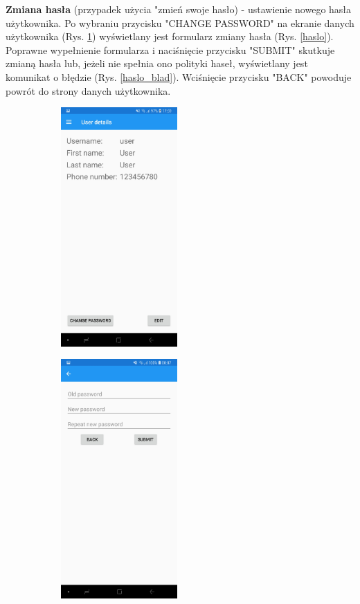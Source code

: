\textbf{Zmiana hasła} (przypadek użycia "zmień swoje hasło) - ustawienie nowego hasła użytkownika. Po wybraniu przycisku "CHANGE PASSWORD" na ekranie danych użytkownika (Rys. \ref{uzytkownik_pass}) wyświetlany jest formularz zmiany hasła (Rys. \ref{haslo}). Poprawne wypełnienie formularza i naciśnięcie przycisku "SUBMIT" skutkuje zmianą hasła lub, jeżeli nie spełnia ono polityki haseł, wyświetlany jest komunikat o błędzie (Rys. \ref{haslo_blad}). Wciśnięcie przycisku "BACK" powoduje powrót do strony danych użytkownika.
\begin{figure}[!ht]
	\begin{center}
		\begin{subfigure}[b]{0.3\textwidth}
			\includegraphics[width=1.75in]{img/mobile/uzytkownik.jpg}
			\label{uzytkownik_pass}
		\end{subfigure}
		\begin{subfigure}[b]{0.3\textwidth}
			\includegraphics[width=1.75in]{img/mobile/haslo.jpg}

\end{subfigure}
\end{center}
\end{figure}
